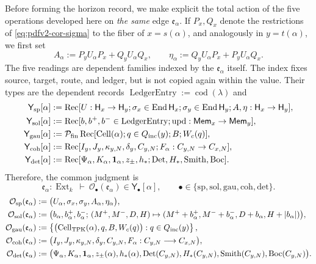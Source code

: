 Before forming the horizon record, we make explicit the total action
of the five operations developed here on \emph{the same} edge
\(\mathfrak e_\alpha\). If \(P_x,Q_x\) denote the restrictions of
\eqref{eq:pdfv2-cor-sigma} to the fiber of \(x=s(\alpha)\), and analogously in
\(y=t(\alpha)\), we first set
\begin{equation}
\label{eq:pdfv2-cor-a-eta-emision}
 A_\alpha:=P_yU_\alpha P_x+Q_yU_\alpha Q_x,
 \qquad
 \eta_\alpha:=Q_yU_\alpha P_x+P_yU_\alpha Q_x.
\end{equation}
The five readings are dependent families indexed by the
\(\mathfrak e_\alpha\) itself. The index fixes source, target, route, and ledger, but
is not copied again within the value. Their types are the dependent
records
\(\operatorname{LedgerEntry}:=\operatorname{cod}(\lambda)\) and
\begin{align*}
 \mathsf Y_{\rm sp}[\alpha]&:=
 \operatorname{Rec}[U:\mathsf H_x\to\mathsf H_y;
 \sigma_x\in\operatorname{End}\mathsf H_x;
 \sigma_y\in\operatorname{End}\mathsf H_y;A,\eta:\mathsf H_x\to\mathsf H_y],\\
 \mathsf Y_{\rm sol}[\alpha]&:=
 \operatorname{Rec}[b,b^+,b^-\in\operatorname{LedgerEntry};
 \operatorname{upd}:\mathsf{Mem}_x\to\mathsf{Mem}_y],\\
 \mathsf Y_{\rm gau}[\alpha]&:=
 \mathcal P_{\rm fin}\operatorname{Rec}[
 \operatorname{Cell}(\alpha);q\in Q_{\rm inc}(y);B;W_c(q)],\\
 \mathsf Y_{\rm coh}[\alpha]&:=
 \operatorname{Rec}[I_y,J_y,\kappa_{y,N},\delta_y,C_{y,N};
 F_\alpha:C_{y,N}\to C_{x,N}],\\
 \mathsf Y_{\rm det}[\alpha]&:=
 \operatorname{Rec}[\Psi_\alpha,K_\alpha,\mathbf1_\alpha,z_\pm,h_*;
 \operatorname{Det},H_*,\operatorname{Smith},\operatorname{Boc}].
\end{align*}
Therefore, the common judgment is
\[
 \mathfrak e_\alpha:\operatorname{Ext}_k\ \vdash\
 \mathcal O_\bullet(\mathfrak e_\alpha)
 \in\mathsf Y_\bullet[\alpha],
 \qquad
 \bullet\in\{\mathrm{sp,sol,gau,coh,det}\}.
\]
\begin{align}
 \mathcal O_{\rm sp}(\mathfrak e_\alpha)
 &:=
 \bigl(U_\alpha,\sigma_x,\sigma_y,
 A_\alpha,\eta_\alpha\bigr),
 \label{eq:pdfv2-cor-accion-sp}\\
 \mathcal O_{\rm sol}(\mathfrak e_\alpha)
 &:=
 \bigl(b_\alpha,b_\alpha^+,b_\alpha^-;\,
 (M^+,M^-,D,H)\mapsto
 (M^++b_\alpha^+,M^-+b_\alpha^-,
  D+b_\alpha,H+|b_\alpha|)\bigr),
 \label{eq:pdfv2-cor-accion-sol}\\
 \mathcal O_{\rm gau}(\mathfrak e_\alpha)
 &:=
 \left\{
 \bigl(\operatorname{Cell}_{\rm TPK}(\alpha),
 q,B,W_c(q)\bigr):
 q\in Q_{\rm inc}(y)
 \right\},
 \label{eq:pdfv2-cor-accion-gau}\\
 \mathcal O_{\rm coh}(\mathfrak e_\alpha)
 &:=
 \bigl(I_y,J_y,\kappa_{y,N},\delta_y,C_{y,N},
 F_\alpha:C_{y,N}\longrightarrow C_{x,N}\bigr),
 \label{eq:pdfv2-cor-accion-coh}\\
 \mathcal O_{\rm det}(\mathfrak e_\alpha)
 &:=
 \bigl(\Psi_\alpha,K_\alpha,\mathbf1_\alpha,z_\pm(\alpha),
 h_*(\alpha),\operatorname{Det}(C_{y,N}),H_*(C_{y,N}),
 \operatorname{Smith}(C_{y,N}),\operatorname{Boc}(C_{y,N})\bigr).
 \label{eq:pdfv2-cor-accion-det}
\end{align}

